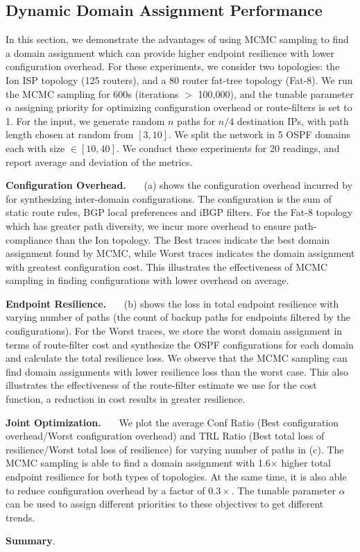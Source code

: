 \subsection{Dynamic Domain Assignment Performance} \label{sec:mcmceval}
In this section, we demonstrate the advantages of using MCMC sampling
to find a domain assignment which can provide higher endpoint resilience
with lower configuration overhead. For these experiments, we consider 
two topologies: the Ion ISP topology (125 routers), and a 80 router 
fat-tree topology (Fat-8). We run the MCMC sampling for 600s (iterations
$>$ 100,000), and the tunable parameter $\alpha$ assigning priority for 
optimizing configuration overhead or route-filters is set to 1. For 
the input, we generate random $n$ paths for $n/4$ destination IPs, with
path length chosen at random from $[3,10]$. We split the network
in 5 OSPF domains each with size $\in [10,40]$. We conduct these
experiments for 20 readings, and report average and deviation of the metrics. 

\noindent\textbf{Configuration Overhead.}~~~
(a) shows the configuration overhead incurred by
\name for synthesizing inter-domain configurations. The configuration
is the sum of static route rules, BGP local preferences and iBGP filters. 
For the Fat-8 topology which has greater path diversity, we incur more 
overhead to ensure path-compliance than the Ion topology. 
The Best traces indicate the best domain assignment found by MCMC, while 
Worst traces indicates the domain assignment with greatest 
configuration cost. 
This illustrates
the effectiveness of MCMC sampling in finding configurations with lower overhead on average.

\noindent\textbf{Endpoint Resilience.}~~~
(b) shows the loss in total endpoint resilience
with varying number of paths (the count 
of backup paths for endpoints filtered by the configurations). For the
Worst traces, we store the worst domain assignment in terms of route-filter
cost and synthesize the OSPF configurations for each domain and calculate
the total resilience loss. We observe that 
the MCMC sampling can find domain 
assignments with lower resilience loss than the worst case. This 
also illustrates the effectiveness of the route-filter estimate we use
for the cost function, a reduction in cost results in greater resilience. 

\noindent\textbf{Joint Optimization.}~~~
We plot the average Conf Ratio 
(Best configuration overhead/Worst configuration overhead) and TRL
Ratio (Best total loss of resilience/Worst total loss of resilience)
for varying number of paths in (c). The MCMC
sampling is able to find a domain assignment
with 1.6$\times$ higher total endpoint resilience for both types
of topologies. At the same time, it is also able to reduce configuration
overhead by a factor of $0.3\times$. The tunable parameter $\alpha$ 
can be used to assign different priorities to these objectives to get
different trends. 

\noindent\textbf{Summary}.
